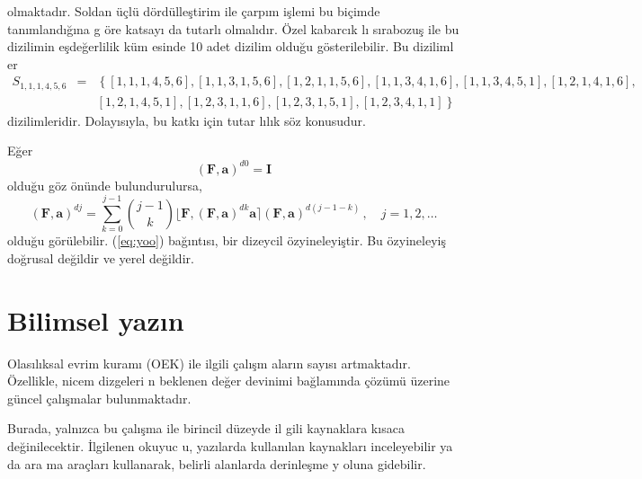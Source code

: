 \documentclass[a4paper,10pt]{article}
\begin{document}
olmaktad\i r. Soldan \"u\c{c}l\"u d\"ord\"ulle\c{s}\-ti\-rim ile %
\c{c}arp\i m i\c{s}lemi bu bi\c{c}imde tan\i mland\i \u{g}\i na g%
\"ore katsay{\i} da tutarl{\i} olmal\i d\i r. \"O\-zel kabarc\i k%
l{\i} s\i rabozu\c{s} ile bu dizilimin e\c{s}de\u{g}erlilik k\"um%
esinde 10 adet dizilim oldu\u{g}u g\"osterilebilir. Bu di\-ziliml%
er %
\begin{eqnarray}
 S_{1,1,1,4,5,6} &=& \left\{[1,1,1,4,5,6],[1,1,3,1,5,6],%
[1,2,1,1,5,6],[1,1,3,4,1,6],[1,1,3,4,5,1],%
[1,2,1,4,1,6],\right.\nonumber\\
 &&\left.[1,2,1,4,5,1],[1,2,3,1,1,6],%
[1,2,3,1,5,1],[1,2,3,4,1,1]\right\}
\end{eqnarray}
dizilimleridir. Dolay\i s\i yla, bu kat\-k{\i} i\-\c{c}in tu\-tar%
l{\i}l\i k s\"oz konusudur. %

E\u{g}er 
\begin{equation}
 \left(\mathbf{F},\mathbf{a}\right)^{d0} = \mathbf{I}
\end{equation}
oldu\u{g}u g\"oz \"on\"unde bulundurulursa, 
\begin{equation}
 \left(\mathbf{F},\mathbf{a}\right)^{dj} = \sum_{k=0}^{j-1} 
 {j-1 \choose k}  \lfloor \mathbf{F} , 
 \left(\mathbf{F},\mathbf{a}\right)^{dk}\mathbf{a} \rceil
 \left(\mathbf{F},\mathbf{a}\right)^{d(j-1-k)} \, ,  
\quad j=1,2,\ldots
\label{eq:yoo}
\end{equation}
oldu\u{g}u g\"or\"ulebilir. (\ref{eq:yoo}) ba\u{g}\i nt\i s{\i},
bir dizeycil \"ozyineleyi\c{s}tir.
Bu \"ozyineleyi\c{s} do\u{g}rusal
de\u{g}ildir ve yerel de\u{g}ildir. 

\section{Bilimsel yaz\i n}

Olas\i l\i ksal evrim kuram{\i} (OEK) ile ilgili \c{c}al\i \c{s}m%
alar\i n say{\i}s{\i} artmaktad\i r. \"Ozellikle, nicem dizgeleri%
n beklenen de\u{g}er devinimi ba\u{g}lam\i nda \c{c}\"oz\"um\"u %
\"uzerine g\"uncel \c{c}al\i \c{s}malar bulunmaktad\i r. %

Burada, yaln\i zca bu \c{c}al\i \c{s}ma ile birincil d\"uzeyde il%
gili kaynaklara k\i saca de\u{g}inilecektir. \.Ilgile\-nen okuyuc%
u, yaz\i larda kullan\i lan kaynaklar{\i} inceleyebilir ya da ara%
ma ara\c{c}lar{\i} kullanarak, belirli alanlarda derinle\c{s}me y%
oluna gidebilir. %
\end{document}
